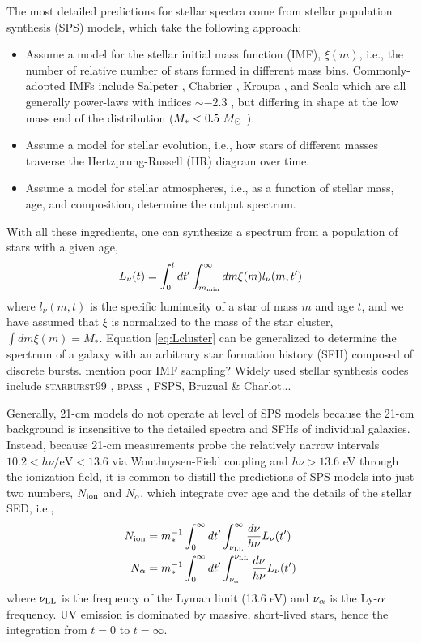 The most detailed predictions for stellar spectra come from stellar population synthesis (SPS) models, which take the following approach:
\begin{itemize}
	\item Assume a model for the stellar initial mass function (IMF), $\xi(m)$, i.e., the number of relative number of stars formed in different mass bins. Commonly-adopted IMFs include Salpeter \cite{Salpeter1955}, Chabrier \cite{Chabrier2003}, Kroupa \cite{Kroupa2001}, and Scalo \cite{Scalo1998} which are all generally power-laws with indices $\sim -2.3$ , but differing in shape at the low mass end of the distribution ($M_{\ast} < 0.5 \ M_{\odot}$ ).
	\item Assume a model for stellar evolution, i.e., how stars of different masses traverse the Hertzprung-Russell (HR) diagram over time.
	\item Assume a model for stellar atmospheres, i.e., as a function of stellar mass, age, and composition, determine the output spectrum.
\end{itemize}
With all these ingredients, one can synthesize a spectrum from a population of stars with a given age,
\begin{equation}
	L_{\nu}(t) = \int_0^t dt^{\prime} \int_{m_{\text{min}}}^{\infty} dm \xi(m) l_{\nu} (m, t^{\prime}) \label{eq:Lcluster}
\end{equation}
where $l_{\nu}(m, t)$ is the specific luminosity of a star of mass $m$ and age $t$, and we have assumed that $\xi$ is normalized to the mass of the star cluster, $\int dm \xi(m) = M_{\ast}$. Equation \ref{eq:Lcluster} can be generalized to determine the spectrum of a galaxy with an arbitrary star formation history (SFH) composed of discrete bursts. {\color{red} mention poor IMF sampling? Widely used stellar synthesis codes include \textsc{starburst99} \cite{Leitherer1999}, \textsc{bpass} \cite{Eldridge2009}, FSPS, Bruzual \& Charlot...}

Generally, 21-cm models do not operate at level of SPS models because the 21-cm background is insensitive to the detailed spectra and SFHs of individual galaxies. Instead, because 21-cm measurements probe the relatively narrow intervals $10.2 < h\nu / \mathrm{eV} < 13.6$ via Wouthuysen-Field coupling and $h\nu > 13.6$ eV through the ionization field, it is common to distill the predictions of SPS models into just two numbers, $N_{\text{ion}}$ and $N_{\alpha}$, which integrate over age and the details of the stellar SED, i.e.,
\begin{align}
	N_{\text{ion}} & = m_{\ast}^{-1} \int_0^{\infty} dt^{\prime} \int_{\nu_{\text{LL}}}^{\infty} \frac{d\nu}{h\nu} L_{\nu}(t^{\prime}) \\
	N_{\alpha} & = m_{\ast}^{-1} \int_0^{\infty} dt^{\prime} \int_{\nu_{\alpha}}^{\nu_{\text{LL}}} \frac{d\nu}{h\nu} L_{\nu}(t^{\prime})
\end{align}
where $\nu_{\text{LL}}$ is the frequency of the Lyman limit (13.6 eV) and $\nu_{\alpha}$ is the Ly-$\alpha$ frequency. UV emission is dominated by massive, short-lived stars, hence the integration from $t=0$ to $t=\infty$.

